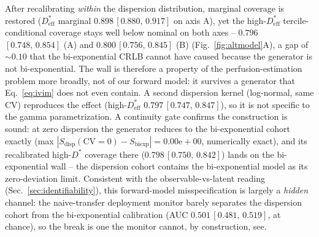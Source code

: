 \documentclass[11pt]{article}
\newcommand{\Dstar}{D^{*}}
\newcommand{\band}[2]{{\scriptsize\,$[#1,\,#2]$}}
\begin{document}
After recalibrating \emph{within} the dispersion distribution, marginal coverage is
restored ($\Dstar_{\mathrm{eff}}$ marginal $0.898$\band{0.880}{0.917} on axis A),
yet the high-$\Dstar_{\mathrm{eff}}$ tercile-conditional coverage stays well below
nominal on both axes -- $0.796$\band{0.748}{0.854} (A) and $0.800$\band{0.756}{0.845}
(B) (Fig.~\ref{fig:altmodel}A), a gap of $\sim0.10$ that the bi-exponential CRLB
cannot have caused because the
generator is not bi-exponential. The wall is therefore a property of the
perfusion-estimation problem more broadly, not of our forward model: it survives a
generator that Eq.~\eqref{eq:ivim} does not even contain. A second dispersion kernel
(log-normal, same CV) reproduces the effect (high-$\Dstar_{\mathrm{eff}}$
$0.797$\band{0.747}{0.847}), so it is not specific to the gamma parametrization. A
continuity gate confirms the construction is sound: at zero dispersion the generator
reduces to the bi-exponential cohort exactly (max
$|S_{\mathrm{disp}}(\mathrm{CV}{=}0)-S_{\mathrm{biexp}}|=0.00\mathrm{e}{+}00$,
numerically exact), and its recalibrated high-$\Dstar$ coverage there
($0.798$\band{0.750}{0.842}) lands on the bi-exponential wall -- the dispersion
cohort contains the bi-exponential model as its zero-deviation limit. Consistent
with the observable-vs-latent reading (Sec.~\ref{sec:identifiability}), this
forward-model misspecification is largely a \emph{hidden} channel: the naive-transfer
deployment monitor barely separates the dispersion cohort from the bi-exponential
calibration (AUC $0.501$\band{0.481}{0.519}, at chance), so the break is one the
monitor cannot, by construction, see.
\end{document}
